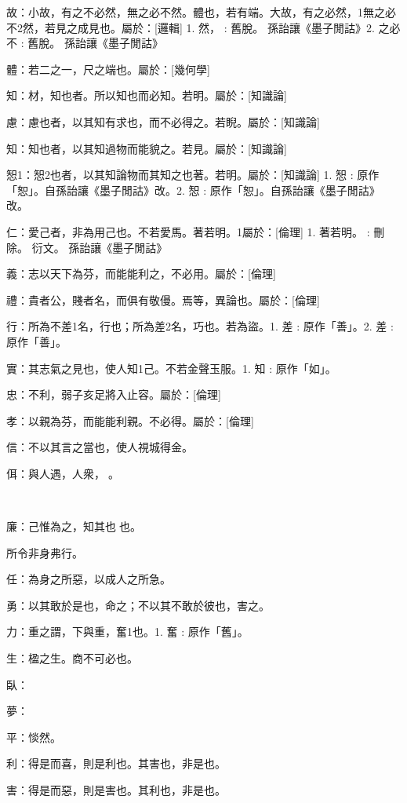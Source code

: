 
\begin{pinyinscope}
故：小故，有之不必然，無之必不然。體也，若有端。大故，有之必然，1無之必不2然，若見之成見也。屬於：[邏輯] 
1. 然， : 舊脫。  孫詒讓《墨子閒詁》2. 之必不 : 舊脫。  孫詒讓《墨子閒詁》

體：若二之一，尺之端也。屬於：[幾何學]

知：材，知也者。所以知也而必知。若明。屬於：[知識論]

慮：慮也者，以其知有求也，而不必得之。若睨。屬於：[知識論]

知：知也者，以其知過物而能貌之。若見。屬於：[知識論]

𢜔1：𢜔2也者，以其知論物而其知之也著。若明。屬於：[知識論] 
1. 𢜔 : 原作「恕」。自孫詒讓《墨子閒詁》改。2. 𢜔 : 原作「恕」。自孫詒讓《墨子閒詁》改。

仁：愛己者，非為用己也。不若愛馬。著若明。1屬於：[倫理] 
1. 著若明。 : 刪除。 衍文。 孫詒讓《墨子閒詁》

義：志以天下為芬，而能能利之，不必用。屬於：[倫理]

禮：貴者公，賤者名，而俱有敬僈。焉等，異論也。屬於：[倫理]

行：所為不差1名，行也；所為差2名，巧也。若為盜。1. 差 : 原作「善」。2. 差 : 原作「善」。

實：其志氣之見也，使人知1己。不若金聲玉服。1. 知 : 原作「如」。

忠：不利，弱子亥足將入止容。屬於：[倫理]

孝：以親為芬，而能能利親。不必得。屬於：[倫理]

信：不以其言之當也，使人視城得金。

佴：與人遇，人衆，𢝺。

𧨜：為是為是之台彼也，弗為也。

廉：己惟為之，知其也𦖷也。

所令非身弗行。

任：為身之所惡，以成人之所急。

勇：以其敢於是也，命之；不以其不敢於彼也，害之。

力：重之謂，下與重，奮1也。1. 奮 : 原作「舊」。

生：楹之生。商不可必也。

臥：

夢：

平：惔然。

利：得是而喜，則是利也。其害也，非是也。

害：得是而惡，則是害也。其利也，非是也。


\end{pinyinscope}
